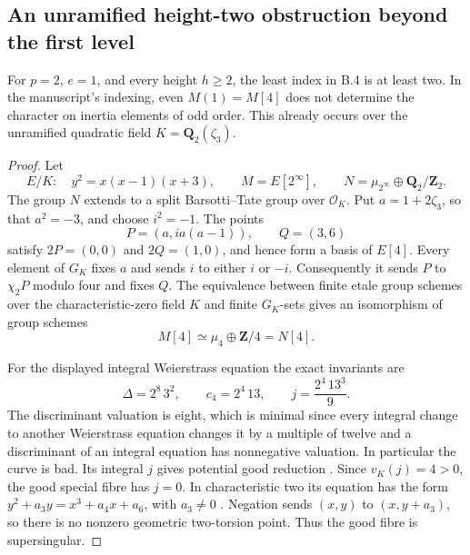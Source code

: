 \subsection{An unramified height-two obstruction beyond the first level}

\begin{proposition}[B-RD22: four-torsion does not suffice at $p=2,e=1$]
\label{prop:B-RD22}
For $p=2$, $e=1$, and every height $h\geq2$, the least index in
B.4 is at least two. In the manuscript's indexing, even
$M(1)=M[4]$ does not determine the character on inertia elements of
odd order. This already occurs over the unramified quadratic field
$K=\mathbf Q_2(\zeta_3)$.
\end{proposition}
\begin{proof}
Let
\[
 E/K:\quad y^2=x(x-1)(x+3),\qquad
 M=E[2^\infty],\qquad
 N=\mu_{2^\infty}\oplus\mathbf Q_2/\mathbf Z_2.
\]
The group $N$ extends to a split Barsotti--Tate group over
$\mathcal O_K$. Put $a=1+2\zeta_3$, so that $a^2=-3$, and choose
$i^2=-1$. The points
\[
       P=(a,ia(a-1)),\qquad Q=(3,6)
\]
satisfy $2P=(0,0)$ and $2Q=(1,0)$, and hence form a basis of
$E[4]$. Every element of $G_K$ fixes $a$ and sends $i$ to either
$i$ or $-i$. Consequently it sends $P$ to $\chi_2 P$ modulo four
and fixes $Q$. The equivalence between finite etale group schemes
over the characteristic-zero field $K$ and finite $G_K$-sets gives
an isomorphism of group schemes
\[
                     M[4]\simeq\mu_4\oplus\mathbf Z/4
                              =N[4].                 \tag{B-RD22.1}
\]

For the displayed integral Weierstrass equation the exact invariants
are
\[
 \Delta=2^8\,3^2,\qquad c_4=2^4\,13,\qquad
 j=\frac{2^4\,13^3}{9}.
\]
The discriminant valuation is eight, which is minimal since every
integral change to another Weierstrass equation changes it by a
multiple of twelve and a discriminant of an integral equation has
nonnegative valuation. In particular the curve is bad. Its integral
$j$ gives potential good reduction
\cite[Section~2, p.496]{SerreTate1968Good}. Since $v_K(j)=4>0$,
the good special fibre has $j=0$. In characteristic two its equation
has the form $y^2+a_3y=x^3+a_4x+a_6$, with $a_3\ne0$
\cite[Section~9.1, p.8]{AnemaTopTuijp2018Hesse}. Negation sends
$(x,y)$ to $(x,y+a_3)$, so there is no nonzero geometric
two-torsion point. Thus the good fibre is supersingular.


\end{proof}
